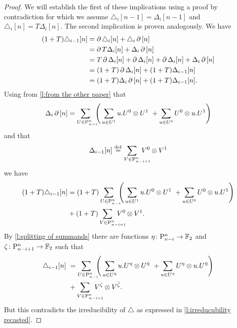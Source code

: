 \begin{proof}
	We will establish the first of these implications using a proof by contradiction for which we assume $\triangle_i [n-1] = \Delta_i [n-1]$ and $\triangle_i [n] = T \Delta_i [n]$.
	The second implication is proven analogously.
	We have
	\begin{align*}
	(1+T) \triangle_{i-1}[n] &=
	\operatorname{\partial} \triangle_i [n] + \triangle_i \operatorname{\partial} \, [n] \\ &=
	\operatorname{\partial} T \Delta_i [n] + \Delta_i \operatorname{\partial} \, [n] \\ &=
	T \operatorname{\partial} \Delta_i [n] + \operatorname{\partial} \Delta_i [n] + \operatorname{\partial} \Delta_i [n] + \Delta_i \operatorname{\partial} \, [n] \\ &=
	(1+T) \operatorname{\partial} \Delta_i [n] + (1+T) \Delta_{i-1} [n] \\ &=
	(1+T) \Delta_i \operatorname{\partial} \, [n] + (1+T) \Delta_{i-1} [n].
	\end{align*}
	Using from \cref{l:from the other paper} that
	\[
	\Delta_i \operatorname{\partial} \, [n] =
	\sum_{U \in \mathrm{P}_{n-i}^n \kern-5pt} \left( \,
	\sum_{u \in U^1} {u.U^0} \otimes {U^1} \ +
	\sum_{u \in U^0} {U^0} \otimes {u.U^1} \right)
	\]
	and that
	\[
	\Delta_{i-1} [n] \defeq
	\sum_{V \in \P_{n-i+1}^n \kern-15pt} V^0 \ot V^1
	\]
	we have
	\begin{align*}
	(1+T) \triangle_{i-1}[n] &=
	(1+T) \sum_{U \in \P_{n-i}^n \kern-5pt} \left( \,
	\sum_{u \in U^1} {u.U^0} \ot {U^1} \ +
	\sum_{u \in U^0} {U^0} \ot {u.U^1} \right) \\ &+
	(1+T) \sum_{V \in \P_{n-i+1}^n \kern-15pt} V^0 \ot V^1.
	\end{align*}
	By \cref{l:splitting of summands} there are functions $\eta \colon \mathrm{P}_{n-i}^n \to {\mathbb{F}_2}$ and $\zeta \colon \mathrm{P}_{n-i+1}^n \to {\mathbb{F}_2}$ such that
	\begin{align*}
	\triangle_{i-1}[n] \ &=
	\sum_{U \in \P_{n-i}^n \kern-5pt} \left( \,
	\sum_{u \in U^\bareta} u.U^\eta \ot U^\bareta \ +
	\sum_{u \in U^\eta} U^\eta \ot u.U^\bareta \right) \\ &+
	\sum_{V \in \P_{n-i+1}^n \kern-15pt} V^\zeta \ot V^\barzeta.
	\end{align*}
	But this contradicts the irreducibility of $\triangle$ as expressed in \cref{l:irreducubility recasted}.
\end{proof}


